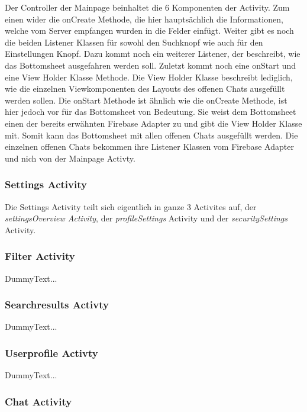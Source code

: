 \documentclass[a4paper,11pt]{report}
\begin{document}
				Der Controller der Mainpage beinhaltet die 6 Komponenten der Activity. Zum einen wider die onCreate Methode, die hier hauptsächlich die Informationen, welche vom Server empfangen wurden in die Felder einfügt. Weiter gibt es noch die beiden Listener Klassen für sowohl den Suchknopf wie auch für den Einstellungen Knopf. Dazu kommt noch ein weiterer Listener, der beschreibt, wie das Bottomsheet ausgefahren werden soll. Zuletzt kommt noch eine onStart und eine View Holder Klasse Methode. Die View Holder Klasse beschreibt lediglich, wie die einzelnen Viewkomponenten des Layouts des offenen Chats ausgefüllt werden sollen. Die onStart Methode ist ähnlich wie die onCreate Methode, ist hier jedoch vor für das Bottomsheet von Bedeutung. Sie weist dem Bottomsheet einen der bereits erwähnten Firebase Adapter zu und gibt die View Holder Klasse mit. Somit kann das Bottomsheet mit allen offenen Chats ausgefüllt werden. Die einzelnen offenen Chats bekommen ihre Listener Klassen vom Firebase Adapter und nich von der Mainpage Activty.
				\subsubsection{Settings Activity} \label{settings:act}
				Die Settings Activity teilt sich eigentlich in ganze 3 Activites auf, der \emph{settingsOverview Activity}, der \emph{profileSettings} Activity und der \emph{securitySettings} Activity.
				\subsubsection{Filter Activity} \label{filter:act}
				DummyText...
				\subsubsection{Searchresults Activty}
				DummyText...
				\subsubsection{Userprofile Activty}
				DummyText...
				\subsubsection{Chat Activity} \label{chat:act}
		
\newpage
	
	
\end{document}
